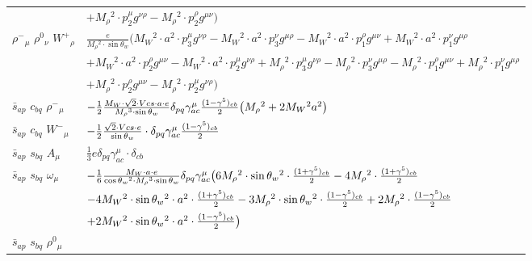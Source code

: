 \begin{center}
\begin{tabular}{|l|l|}
  & $+ M_\rho{}^2 \cdot p_2^\mu g^{\nu \rho} - M_\rho{}^2 \cdot p_2^\rho g^{\mu \nu} \big)$\\[2mm]
$\rho^-{}_{\mu }$ \phantom{-} $\rho^0{}_{\nu }$ \phantom{-} $W^+{}_{\rho }$ \phantom{-}  &
	$\frac{ e}{ M_\rho{}^2  \cdot \sin{\theta}_w}\big( M_W{}^2 \cdot  a{}^2 \cdot p_3^\mu g^{\nu \rho} - M_W{}^2 \cdot  a{}^2 \cdot p_3^\nu g^{\mu \rho} - M_W{}^2 \cdot  a{}^2 \cdot p_1^\rho g^{\mu \nu} + M_W{}^2 \cdot  a{}^2 \cdot p_1^\nu g^{\mu \rho} $ \\[2mm]
  & $+ M_W{}^2 \cdot  a{}^2 \cdot p_2^\rho g^{\mu \nu} - M_W{}^2 \cdot  a{}^2 \cdot p_2^\mu g^{\nu \rho} + M_\rho{}^2 \cdot p_3^\mu g^{\nu \rho} - M_\rho{}^2 \cdot p_3^\nu g^{\mu \rho} - M_\rho{}^2 \cdot p_1^\rho g^{\mu \nu} + M_\rho{}^2 \cdot p_1^\nu g^{\mu \rho} $ \\[2mm]
  & $+ M_\rho{}^2 \cdot p_2^\rho g^{\mu \nu} - M_\rho{}^2 \cdot p_2^\mu g^{\nu \rho} \big)$\\[2mm]
$\bar{s}{}_{a p }$ \phantom{-} $c{}_{b q }$ \phantom{-} $\rho^-{}_{\mu }$ \phantom{-}  &
	$-\frac{1}{2}\frac{ M_W \cdot\sqrt{2} \cdot Vcs \cdot a \cdot e}{ M_\rho{}^3  \cdot \sin{\theta}_w}\delta_{p q} \gamma_{a c}^\mu {(1-\gamma^5)_{c b}\over 2} \big( M_\rho{}^2 +2 M_W{}^2  a{}^2 \big)$\\[2mm]
$\bar{s}{}_{a p }$ \phantom{-} $c{}_{b q }$ \phantom{-} $W^-{}_{\mu }$ \phantom{-}  &
	$-\frac{1}{2}\frac{\sqrt{2} \cdot Vcs \cdot e}{ \sin{\theta}_w}\cdot \delta_{p q} \gamma_{a c}^\mu {(1-\gamma^5)_{c b}\over 2} $\\[2mm]
$\bar{s}{}_{a p }$ \phantom{-} $s{}_{b q }$ \phantom{-} ${A}_{\mu }$ \phantom{-}  &
	$\frac{1}{3} e\delta_{p q} \gamma_{a c}^\mu \cdot \delta_{c b} $\\[2mm]
$\bar{s}{}_{a p }$ \phantom{-} $s{}_{b q }$ \phantom{-} $\omega{}_{\mu }$ \phantom{-}  &
	$-\frac{1}{6}\frac{ M_W \cdot a \cdot e}{ \cos{\theta}_w{}^2  \cdot M_\rho{}^3  \cdot \sin{\theta}_w}\delta_{p q} \gamma_{a c}^\mu \big(6 M_\rho{}^2 \cdot  \sin{\theta}_w{}^2 \cdot {(1+\gamma^5)_{c b}\over 2} -4 M_\rho{}^2 \cdot {(1+\gamma^5)_{c b}\over 2} $ \\[2mm]
  & $-4 M_W{}^2 \cdot  \sin{\theta}_w{}^2 \cdot  a{}^2 \cdot {(1+\gamma^5)_{c b}\over 2} -3 M_\rho{}^2 \cdot  \sin{\theta}_w{}^2 \cdot {(1-\gamma^5)_{c b}\over 2} +2 M_\rho{}^2 \cdot {(1-\gamma^5)_{c b}\over 2} $ \\[2mm]
  & $+2 M_W{}^2 \cdot  \sin{\theta}_w{}^2 \cdot  a{}^2 \cdot {(1-\gamma^5)_{c b}\over 2} \big)$\\[2mm]
$\bar{s}{}_{a p }$ \phantom{-} $s{}_{b q }$ \phantom{-} $\rho^0{}_{\mu }$ \phantom{-}  &

\end{tabular}
\end{center}
